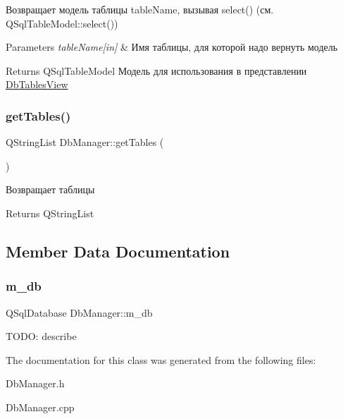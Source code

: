 Возвращает модель таблицы table\+Name, вызывая select() (см. Q\+Sql\+Table\+Model\+::select()) 


\begin{DoxyParams}{Parameters}
{\em table\+Name\mbox{[}in\mbox{]}} & Имя таблицы, для которой надо вернуть модель \\
\hline
\end{DoxyParams}
\begin{DoxyReturn}{Returns}
Q\+Sql\+Table\+Model Модель для использования в представлении \hyperlink{class_db_tables_view}{Db\+Tables\+View} 
\end{DoxyReturn}
\mbox{\label{class_db_manager_a56efe9d49dc68dcdef05ae834f7618b0}} 
\subsubsection{\texorpdfstring{get\+Tables()}{getTables()}}
{\footnotesize\ttfamily Q\+String\+List Db\+Manager\+::get\+Tables (\begin{DoxyParamCaption}{ }\end{DoxyParamCaption})}



Возвращает таблицы 

\begin{DoxyReturn}{Returns}
Q\+String\+List 
\end{DoxyReturn}


\subsection{Member Data Documentation}
\mbox{\label{class_db_manager_a289f7f1c539781db95292c79fb13a632}} 
\subsubsection{\texorpdfstring{m\+\_\+db}{m\_db}}
{\footnotesize\ttfamily Q\+Sql\+Database Db\+Manager\+::m\+\_\+db}

T\+O\+DO\+: describe 

The documentation for this class was generated from the following files\+:\begin{DoxyCompactItemize}
\item 
Db\+Manager.\+h\item 
Db\+Manager.\+cpp\end{DoxyCompactItemize}

